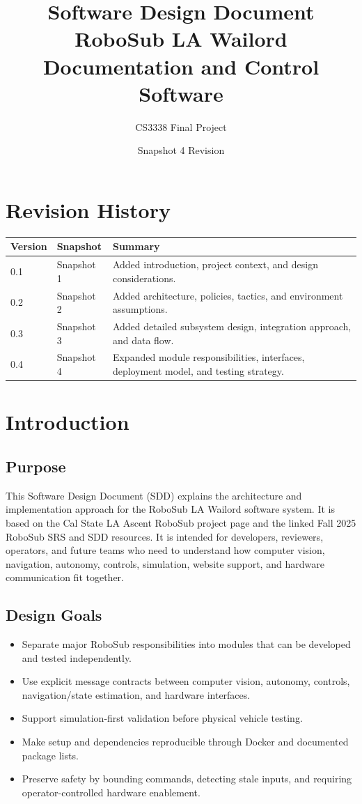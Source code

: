 \documentclass[12pt]{article}
\title{Software Design Document\\RoboSub LA Wailord Documentation and Control Software}
\author{CS3338 Final Project}
\date{Snapshot 4 Revision}
\begin{document}
\maketitle
\tableofcontents
\newpage

\section{Revision History}
\begin{longtable}{|p{}|p{}|p{}|}
\hline
\textbf{Version} & \textbf{Snapshot} & \textbf{Summary} \\
\hline
0.1 & Snapshot 1 & Added introduction, project context, and design considerations. \\
\hline
0.2 & Snapshot 2 & Added architecture, policies, tactics, and environment assumptions. \\
\hline
0.3 & Snapshot 3 & Added detailed subsystem design, integration approach, and data flow. \\
\hline
0.4 & Snapshot 4 & Expanded module responsibilities, interfaces, deployment model, and testing strategy. \\
\hline
\end{longtable}

\section{Introduction}
\subsection{Purpose}
This Software Design Document (SDD) explains the architecture and implementation approach for the RoboSub LA Wailord software system. It is based on the Cal State LA Ascent RoboSub project page and the linked Fall 2025 RoboSub SRS and SDD resources. It is intended for developers, reviewers, operators, and future teams who need to understand how computer vision, navigation, autonomy, controls, simulation, website support, and hardware communication fit together.

\subsection{Design Goals}
\begin{itemize}[leftmargin=*]
  \item Separate major RoboSub responsibilities into modules that can be developed and tested independently.
  \item Use explicit message contracts between computer vision, autonomy, controls, navigation/state estimation, and hardware interfaces.
  \item Support simulation-first validation before physical vehicle testing.
  \item Make setup and dependencies reproducible through Docker and documented package lists.
  \item Preserve safety by bounding commands, detecting stale inputs, and requiring operator-controlled hardware enablement.
\end{itemize}
\end{document}
